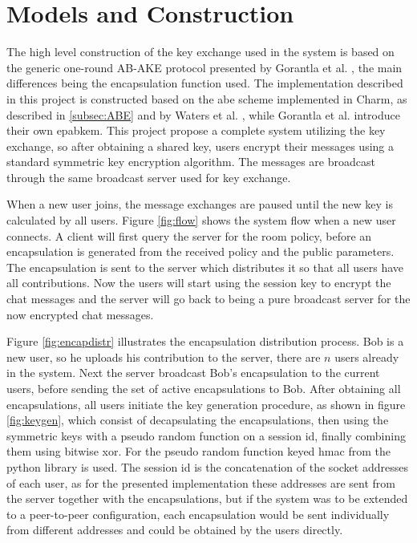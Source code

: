 \section{Models and Construction}\label{sec:models}
The high level construction of the key exchange used in the system is based on the generic one-round AB-AKE protocol presented by Gorantla et al. \cite{gorantla2010attribute}, the main differences being the encapsulation function used. The implementation described in this project is constructed based on the \gls{abe} scheme implemented in Charm, as described in \ref{subsec:ABE} and  by Waters et al. \cite{abe_waters09}, while Gorantla et al. \cite{gorantla2010attribute} introduce their own \gls{epabkem}. This project propose a complete system utilizing the key exchange, so after obtaining a shared key, users encrypt their messages using a standard symmetric key encryption algorithm. The messages are broadcast through the same broadcast server used for key exchange. 
\par When a new user joins, the message exchanges are paused until the new key is calculated by all users. Figure \ref{fig:flow} shows the system flow when a new user connects. A client will first query the server for the room policy, before an encapsulation is generated from the received policy and the public parameters. The encapsulation is sent to the server which distributes it so that all users have all contributions. Now the users will start using the session key to encrypt the chat messages and the server will go back to being a pure broadcast server for the now encrypted chat messages. 
\par Figure \ref{fig:encapdistr} illustrates the encapsulation distribution process. Bob is a new user, so he uploads his contribution to the server, there are $n$ users already in the system. Next the server broadcast Bob's encapsulation to the current users, before sending the set of active encapsulations to Bob. After obtaining all encapsulations, all users initiate the key generation procedure, as shown in figure \ref{fig:keygen}, which consist of decapsulating the encapsulations, then using the symmetric keys with a pseudo random function on a session id, finally combining them using bitwise xor. For the pseudo random function keyed hmac from the python library is used. The session id is the concatenation of the socket addresses of each user, as for the presented implementation these addresses are sent from the server together with the encapsulations, but if the system was to be extended to a peer-to-peer configuration, each encapsulation would be sent individually from different addresses and could be obtained by the users directly. 

